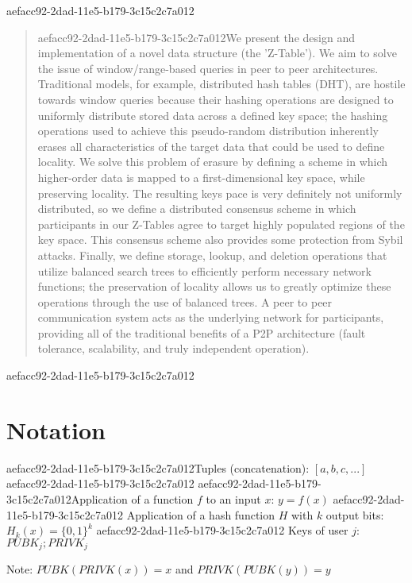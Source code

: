 \documentclass[12pt]{article}
\begin{document}
\maketitle

aefacc92-2dad-11e5-b179-3c15c2c7a012\begin{abstract}
aefacc92-2dad-11e5-b179-3c15c2c7a012We present the design and implementation of a novel data structure (the 'Z-Table'). We aim to solve the issue of window/range-based queries in peer to peer architectures. Traditional models, for example,  distributed hash tables (DHT), are hostile towards window queries because their hashing operations are designed to uniformly distribute stored data across a defined key space; the hashing operations used to achieve this pseudo-random distribution inherently erases all characteristics of the target data that could be used to define locality. We solve this problem of erasure by defining a scheme in which higher-order data is mapped to a first-dimensional key space, while preserving locality. The resulting keys pace is very definitely not uniformly distributed, so we define a distributed consensus scheme in which participants in our Z-Tables agree to target highly populated regions of the key space. This consensus scheme also provides some protection from Sybil attacks. Finally, we define storage, lookup, and deletion operations that utilize balanced search trees to efficiently perform necessary network functions; the preservation of locality allows us to greatly optimize these operations through the use of balanced trees. A peer to peer communication system acts as the underlying network for participants, providing all of the traditional benefits of a P2P architecture (fault tolerance, scalability, and truly independent operation).
\end{abstract}

aefacc92-2dad-11e5-b179-3c15c2c7a012\section{Notation}

aefacc92-2dad-11e5-b179-3c15c2c7a012Tuples (concatenation): $[a,b,c,...]$
aefacc92-2dad-11e5-b179-3c15c2c7a012
aefacc92-2dad-11e5-b179-3c15c2c7a012Application of a function $f$ to an input $x$: $y=f(x)$
aefacc92-2dad-11e5-b179-3c15c2c7a012
Application of a hash function $H$ with $k$ output bits: $H_{k}(x) = \{0,1\}^k$
aefacc92-2dad-11e5-b179-3c15c2c7a012
Keys of user $j$: $ PUBK_j; PRIVK_j $

Note: $PUBK(PRIVK(x)) = x$ and $PRIVK(PUBK(y)) = y$~
\end{document}
